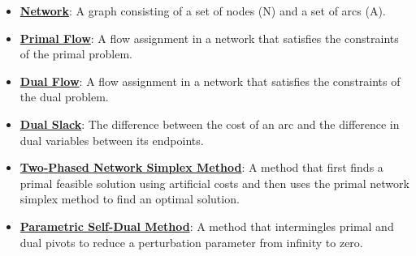 \documentclass{article}%
\begin{document}
\begin{itemize}[leftmargin=*]%
\item \href{https://www.math.purdue.edu/~yipn/421/2024-11-07-NetSimplex.pdf#page=1}{\textbf{Network}}: A graph consisting of a set of nodes (N) and a set of arcs (A).%
\item \href{https://www.math.purdue.edu/~yipn/421/2024-11-07-NetSimplex.pdf#page=2}{\textbf{Primal Flow}}: A flow assignment in a network that satisfies the constraints of the primal problem.%
\item \href{https://www.math.purdue.edu/~yipn/421/2024-11-07-NetSimplex.pdf#page=3}{\textbf{Dual Flow}}: A flow assignment in a network that satisfies the constraints of the dual problem.%
\item \href{https://www.math.purdue.edu/~yipn/421/2024-11-07-NetSimplex.pdf#page=3}{\textbf{Dual Slack}}: The difference between the cost of an arc and the difference in dual variables between its endpoints.%
\item \href{https://www.math.purdue.edu/~yipn/421/2024-11-07-NetSimplex.pdf#page=45}{\textbf{Two{-}Phased Network Simplex Method}}: A method that first finds a primal feasible solution using artificial costs and then uses the primal network simplex method to find an optimal solution.%
\item \href{https://www.math.purdue.edu/~yipn/421/2024-11-07-NetSimplex.pdf#page=45}{\textbf{Parametric Self{-}Dual Method}}: A method that intermingles primal and dual pivots to reduce a perturbation parameter from infinity to zero.%
\end{itemize}%
\end{document}
